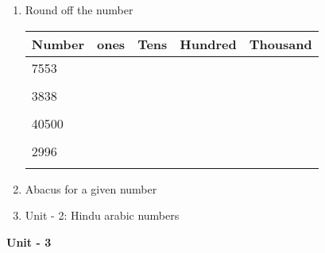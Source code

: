 \begin{enumerate}
    \item Round off the number

    \begin{myTableStyle} \begin{tabular}{ |m{2cm}|m{2.5cm}|m{2.5cm}|m{2.5cm}|m{2.5cm}| } \hline
        Number & ones & Tens & Hundred & Thousand  \\\hline
        7553 & & & & \\& & & & \\ \hline
        3838 & & & &\\& & & & \\ \hline
        40500& & & &\\& & & & \\ \hline
        2996 & & & &\\& & & & \\ \hline
    \end{tabular} \end{myTableStyle} \vspace{0.08in}

    \item Abacus for a given number

    \item Unit - 2: Hindu arabic numbers

\end{enumerate}

\newpage \centerline{\textbf{ \LARGE  Unit - 3 }}

